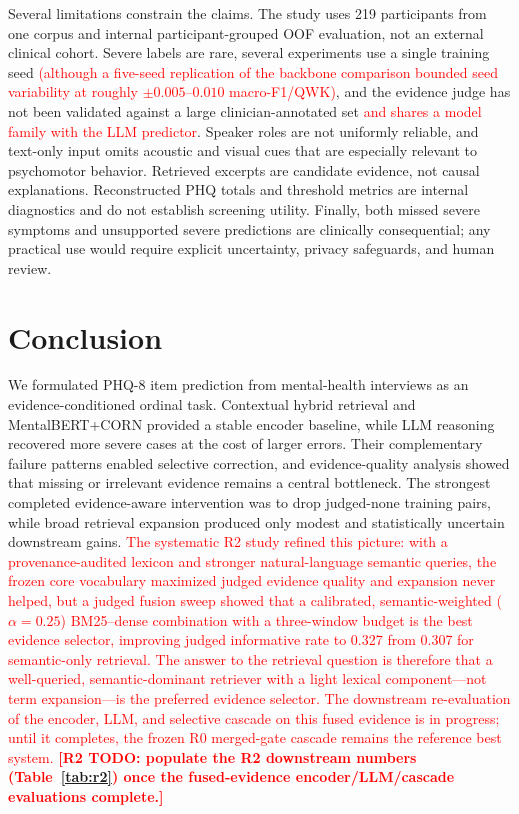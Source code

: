 \documentclass{article}
\newcommand{\todoRtwo}[1]{\textcolor{red}{\textbf{[R2 TODO: #1]}}}
\DeclareRobustCommand{\rev}[1]{\textcolor{red}{#1}}
\begin{document}
Several limitations constrain the claims. The study uses 219 participants from one corpus and internal participant-grouped OOF evaluation, not an external clinical cohort. Severe labels are rare, several experiments use a single training seed \rev{(although a five-seed replication of the backbone comparison bounded seed variability at roughly $\pm 0.005$--$0.010$ macro-F1/QWK)}, and the evidence judge has not been validated against a large clinician-annotated set \rev{and shares a model family with the LLM predictor}. Speaker roles are not uniformly reliable, and text-only input omits acoustic and visual cues that are especially relevant to psychomotor behavior. Retrieved excerpts are candidate evidence, not causal explanations. Reconstructed PHQ totals and threshold metrics are internal diagnostics and do not establish screening utility. Finally, both missed severe symptoms and unsupported severe predictions are clinically consequential; any practical use would require explicit uncertainty, privacy safeguards, and human review.

\section{Conclusion}
\label{sec:conclusion}
We formulated PHQ-8 item prediction from mental-health interviews as an evidence-conditioned ordinal task. Contextual hybrid retrieval and MentalBERT+CORN provided a stable encoder baseline, while LLM reasoning recovered more severe cases at the cost of larger errors. Their complementary failure patterns enabled selective correction, and evidence-quality analysis showed that missing or irrelevant evidence remains a central bottleneck. The strongest completed evidence-aware intervention was to drop judged-none training pairs, while broad retrieval expansion produced only modest and statistically uncertain downstream gains. \rev{The systematic R2 study refined this picture: with a provenance-audited lexicon and stronger natural-language semantic queries, the frozen core vocabulary maximized judged evidence quality and expansion never helped, but a judged fusion sweep showed that a calibrated, semantic-weighted ($\alpha=0.25$) BM25--dense combination with a three-window budget is the best evidence selector, improving judged informative rate to 0.327 from 0.307 for semantic-only retrieval. The answer to the retrieval question is therefore that a well-queried, semantic-dominant retriever with a light lexical component---not term expansion---is the preferred evidence selector. The downstream re-evaluation of the encoder, LLM, and selective cascade on this fused evidence is in progress; until it completes, the frozen R0 merged-gate cascade remains the reference best system.} \todoRtwo{populate the R2 downstream numbers (Table~\ref{tab:r2}) once the fused-evidence encoder/LLM/cascade evaluations complete.}
\end{document}

